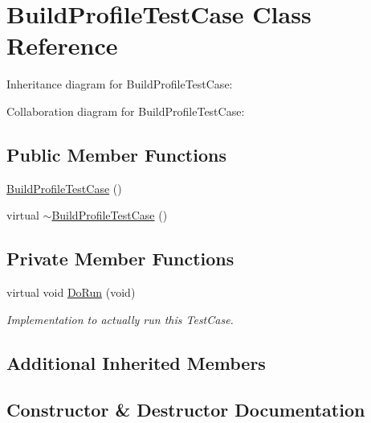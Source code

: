 \hypertarget{classBuildProfileTestCase}{}\section{Build\+Profile\+Test\+Case Class Reference}
\label{classBuildProfileTestCase}


Inheritance diagram for Build\+Profile\+Test\+Case\+:


Collaboration diagram for Build\+Profile\+Test\+Case\+:
\subsection*{Public Member Functions}
\begin{DoxyCompactItemize}
\item 
\hyperlink{classBuildProfileTestCase_ad3021577ee871f4384c4d09f90f2a062}{Build\+Profile\+Test\+Case} ()
\item 
virtual \hyperlink{classBuildProfileTestCase_a65a84e1e59ab2dadd047d31a87aa78ec}{$\sim$\+Build\+Profile\+Test\+Case} ()
\end{DoxyCompactItemize}
\subsection*{Private Member Functions}
\begin{DoxyCompactItemize}
\item 
virtual void \hyperlink{classBuildProfileTestCase_abb37c55f2baa4ebc0f01f92255a5008b}{Do\+Run} (void)
\begin{DoxyCompactList}\small\item\em Implementation to actually run this Test\+Case. \end{DoxyCompactList}\end{DoxyCompactItemize}
\subsection*{Additional Inherited Members}


\subsection{Constructor \& Destructor Documentation}
